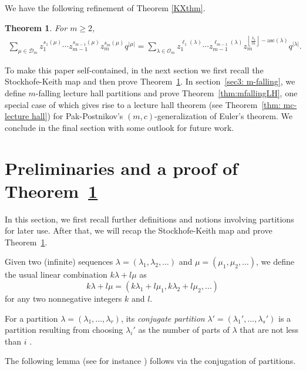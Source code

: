 \documentclass[11pt,reqno]{amsart}
\numberwithin{equation}{section}
\theoremstyle{plain}
\newtheorem{theorem}{Theorem}[section]
\theoremstyle{definition}
\newcommand{\D}{\mathcal{D}}
\newcommand{\OO}{\mathcal{O}}
\def\asc{\mathrm{asc}}
\begin{document}
We have the following refinement of  Theorem \ref{KXthm}.
\begin{theorem}\label{thm: one para refine}
For $m\ge 2$,
\begin{align}
\sum_{\mu \in\D_m}z_1^{s_1(\mu)}\cdots z_{m-1}^{s_{m-1}(\mu)}z_m^{s_m(\mu)}q^{|\mu|}=\sum_{\lambda\in\OO_m}z_1^{\ell_1(\lambda)}\cdots z_{m-1}^{\ell_{m-1}(\lambda)}z_m^{\left\lfloor\frac{\lambda_1}{m}\right\rfloor-\asc(\lambda)}q^{|\lambda|}.
\end{align}
\end{theorem}












To make this paper self-contained, in the next section we first recall the Stockhofe-Keith map and then prove Theorem~\ref{thm: one para refine}. In section~\ref{sec3: m-falling}, we define $m$-falling lecture hall partitions and prove Theorem~\ref{thm:mfallingLH}, one special case of which gives rise to a lecture hall theorem (see Theorem~\ref{thm: mc-lecture hall}) for Pak-Postnikov's $(m,c)$-generalization \cite{PP} of Euler's theorem. We conclude in the final section with some outlook for future work.




\section{Preliminaries and a proof of Theorem~\ref{thm: one para refine}}\label{sec2: one para refine}


In this section, we first recall further definitions and notions involving partitions for later use. After that, we will recap the Stockhofe-Keith map and prove Theorem~\ref{thm: one para refine}.

Given two (infinite) sequences $\lambda=(\lambda_1,\lambda_2,\ldots)$ and $\mu=(\mu_1,\mu_2,\ldots)$,  we define the usual linear combination $k\lambda+l\mu$ as
$$
k\lambda+l\mu=(k\lambda_1+l\mu_1,k\lambda_2+l\mu_2,\ldots)
$$
for any two nonnegative integers $k$ and $l$.

For a partition $\lambda=(\lambda_1,\ldots,\lambda_r)$, its \emph{conjugate partition} $\lambda'=(\lambda_1',\ldots,\lambda_s')$ is a partition resulting from choosing $\lambda_i'$ as the number of parts of $\lambda$ that are not less than $i$  \cite[Definition~1.8]{Andr1976}.

The following lemma (see for instance \cite[Lemma 1]{KX}) follows  via the conjugation of partitions.
\end{document}
